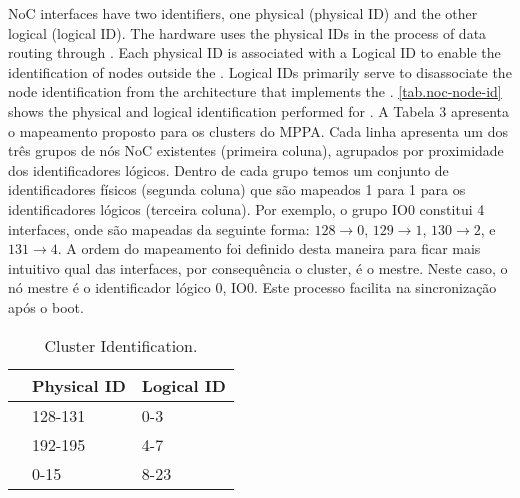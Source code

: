 		NoC interfaces have two identifiers, one physical (physical ID) and the other logical (logical ID).
		The hardware uses the physical IDs in the process of data routing through \noc.
		Each physical ID is associated with a Logical ID to enable the identification
		of \noc nodes outside the \hal.
		Logical IDs primarily serve to disassociate the node identification from the
		architecture that implements the \hal.
			\autoref{tab.noc-node-id} shows the physical and logical identification performed for \mppa.
		A Tabela 3 apresenta o mapeamento proposto para os clusters do MPPA.
		Cada linha apresenta um dos três grupos de nós NoC existentes (primeira coluna), agrupados por proximidade dos identificadores lógicos.
		Dentro de cada grupo temos um conjunto de identificadores físicos (segunda coluna) que são mapeados 1 para 1 para os identificadores lógicos (terceira coluna).
		Por exemplo, o grupo IO0 constitui 4 interfaces, onde são mapeadas da seguinte forma: $128 \to 0$, $129 \to 1$, $130 \to 2$, e $131 \to 4$.
		A ordem do mapeamento foi definido desta maneira para ficar mais intuitivo qual das interfaces, por consequência o cluster, é o mestre.
		Neste caso, o nó mestre é o identificador lógico 0, IO0.
		Este processo facilita na sincronização após o boot.

		\begin{table}[!tb]
			\centering%
			\caption{Cluster Identification.}%
			\label{tab.noc-node-id}%

			\begin{tabular}{l|l|l|}
				\cline{2-3}
									                       & \textbf{Physical ID} & \textbf{Logical ID} \\ \hline
				\multicolumn{1}{|l|}{\textbf{\iocluster0}} & 128-131              & 0-3                 \\ \hline
				\multicolumn{1}{|l|}{\textbf{\iocluster1}} & 192-195              & 4-7                 \\ \hline
				\multicolumn{1}{|l|}{\textbf{\ccluster}}   & 0-15                 & 8-23                \\ \hline
			\end{tabular}

		\end{table}

